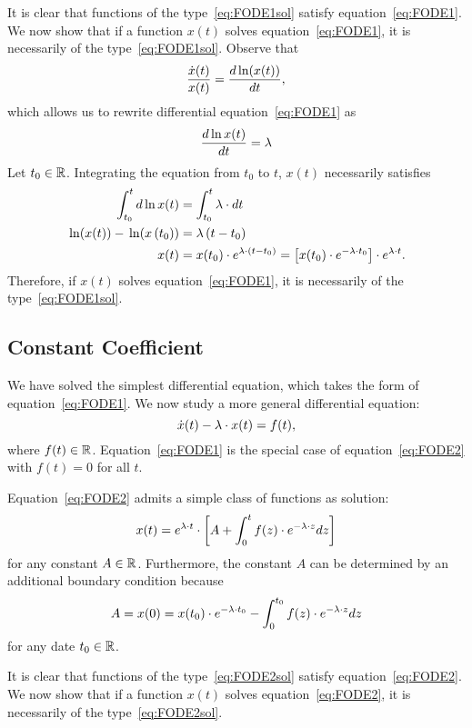\documentclass[letterpaper,12pt,leqno]{article}
\begin{document}
It is clear that functions of the type~\eqref{eq:FODE1sol} satisfy equation~\eqref{eq:FODE1}. We now show that if a function $x(t)$ solves equation~\eqref{eq:FODE1}, it is necessarily of the type~\eqref{eq:FODE1sol}.
Observe that
\begin{equation*}
\frac{\dot{x}(t)}{x(t)}=\od{\ln{x(t)}}{t},
\end{equation*}
which allows us to rewrite differential equation~\eqref{eq:FODE1} as 
\begin{equation*}
\frac{d\ln x(t)}{dt}=\l
\end{equation*}
Let $t_{0}\in\mathbb{R}$. Integrating the equation from $t_{0}$ to $t$, $x(t)$ necessarily satisfies
\begin{align*}
\int_{t_{0}}^{t} d\ln x(t)&=\int_{t_{0}}^{t} \l\cdot dt\\
\ln{x(t)} -\ln{ x\bp{t_{0}}}& =\l \bp{t-t_{0}}\\
x(t)&=x(t_{0})\cdot  e^{\l \cdot(t-t_{0})}=\bs{x(t_{0})\cdot e^{-\l \cdot t_{0}}}\cdot e^{\l \cdot t}.
\end{align*}
Therefore, if $x(t)$ solves equation~\eqref{eq:FODE1}, it is necessarily of the type~\eqref{eq:FODE1sol}.

 
\subsection{Constant Coefficient}

We have solved the simplest differential equation, which takes the form of equation~\eqref{eq:FODE1}. We now study a more general differential equation: 
\begin{equation}
\dot{x}(t)-\lambda \cdot x(t) =f(t),\label{eq:FODE2}
\end{equation}
where $f(t)\in \mathbb{R}$. Equation~\eqref{eq:FODE1} is the special case of equation~\eqref{eq:FODE2} with $f(t)=0$ for all $t$.

Equation~\eqref{eq:FODE2} admits a simple class of functions as solution:
\begin{equation}
x(t)=e^{\lambda \cdot t} \cdot \left[ A+\int_{0}^{t}f(z) \cdot e^{-\lambda \cdot z} dz \right] \label{eq:FODE2sol}
\end{equation}
for any constant $A\in \mathbb{R}$. Furthermore, the constant $A$ can be determined by an additional boundary condition because
\[A=x(0)=x(t_{0})\cdot e^{-\lambda \cdot t_{0}}-\int_{0}^{t_{0}}f(z) \cdot e^{-\lambda \cdot z} dz\]
for any date $t_{0}\in \mathbb{R}$.

It is clear that functions of the type~\eqref{eq:FODE2sol} satisfy equation~\eqref{eq:FODE2}. We now show that if a function $x(t)$ solves equation~\eqref{eq:FODE2}, it is necessarily of the type~\eqref{eq:FODE2sol}.
\end{document}
